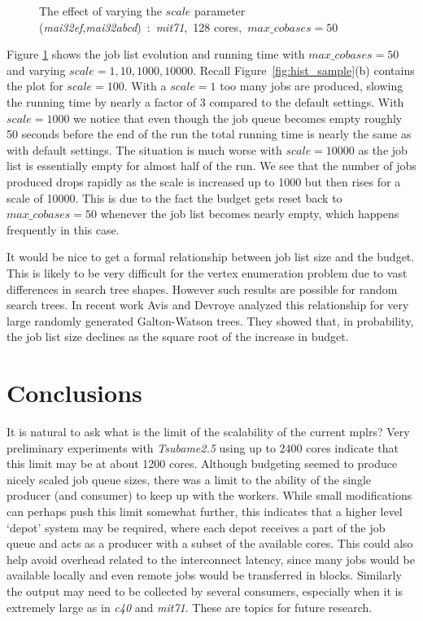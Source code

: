 \documentclass[a4paper,11pt]{article}   \usepackage{authblk} \usepackage[top=1.9cm,bottom=1.9cm,left=1.9cm,right=1.9cm]{geometry}
\newcommand{\progname}{\textsf}
\newcommand{\compname}{\emph}
\newcommand{\mplrs}{\progname{mplrs}\xspace}
\newcommand{\mainew}{\compname{mai32abcd}\xspace}
\newcommand{\maief}{\compname{mai32ef}\xspace}
\newcommand{\tsubame}{\compname{Tsubame2.5}\xspace}
\newcommand{\polytope}{\emph}
\newcommand{\cforty}{\polytope{c40}\xspace}
\newcommand{\mitseven}{\polytope{mit71}\xspace}
\newcommand{\maxcobases}{\ensuremath{\mathit{max\_cobases}}\xspace}
\newcommand{\myscale}{\ensuremath{\mathit{scale}}\xspace}
\begin{document}
\begin{figure}[htb]
\caption{The effect of varying the \myscale parameter (\maief,\mainew)~:~\mitseven,~128 cores,~$\maxcobases=50$}
\label{fig:scale}
\end{figure}

Figure \ref{fig:scale} shows the job list evolution and running time with
$\maxcobases=50$
and varying $\myscale=1,10,1000,10000$. Recall 
Figure~\ref{fig:hist_sample}(b) contains the plot for $\myscale=100$.
With a $\myscale=1$ too many jobs are produced, slowing the running time by
nearly a factor of 3 compared to the default settings.
With $\myscale=1000$ we notice that even though the job queue becomes 
empty roughly 50 seconds before
the end of the run the total running time is nearly the same as with default settings. 
The situation is much worse with $\myscale=10000$ as the job list is essentially
empty for almost half of the run.
We see that the number of jobs produced drops rapidly
as the scale is increased up to 1000 but then rises for a scale of 10000. 
This is due to the fact the budget gets reset back to $\maxcobases=50$ 
whenever the job list becomes nearly empty,
which happens frequently in this case.

It would be nice to get a formal relationship between job list size and the budget.
This is likely to be very difficult for the vertex enumeration problem due to vast
differences in search tree shapes. However such results are possible for random
search trees.
In recent work Avis and Devroye \cite{AD17a} analyzed this relationship for 
very large randomly generated Galton-Watson trees.
They showed that, in probability,
the job list size declines as the square root of the increase in budget.

\section{Conclusions}
\label{conclusions}
It is natural to ask what is the limit of the scalability of the current \mplrs?
Very preliminary experiments with \tsubame using up to 2400 cores indicate that this limit may be 
at about 1200 cores. Although budgeting seemed to produce nicely scaled job queue sizes,
there was a limit to the ability of the single producer (and consumer) to keep up with the workers.
While small modifications can perhaps push this limit somewhat further,
this indicates that a higher level `depot' system may be required, where each depot
receives a part of the job queue and acts as a producer with a subset of the available cores.
This could also help avoid overhead related to the interconnect latency, since
many jobs would be available locally and even remote jobs would be transferred 
in blocks.
Similarly the output may need to be collected by several consumers, especially when it is 
extremely large as in \cforty and \mitseven. These are topics for future research.
\end{document}
